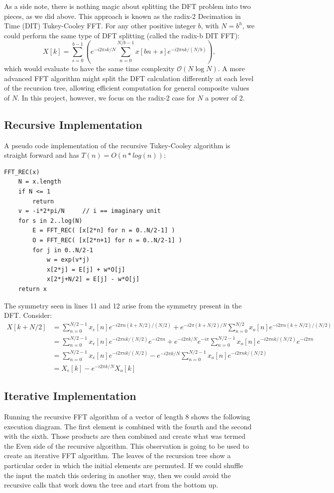 As a side note, there is nothing magic about splitting the DFT problem into two pieces, as we did above. This approach is known as the radix-2 Decimation in Time (DIT) Tukey-Cooley FFT. For any other positive integer $b$, with $N = b^h$, we could perform the same type of DFT splitting (called the radix-b DIT FFT):
\[
X[k] = \sum_{s=0}^{b-1} \left( e^{-i2\pi s k/N}\sum_{n=0}^{N/b-1}x[bn+s]e^{-i2\pi n k /(N/b)} \right),
\]
which would evaluate to have the same time complexity $\mathcal{O}(N\log N)$. A more advanced FFT algorithm might split the DFT calculation differently at each level of the recursion tree, allowing efficient computation for general composite values of $N$. In this project, however, we focus on the radix-2 case for $N$ a power of 2.

\pagebreak
\subsection{Recursive Implementation}
A pseudo code implementation of the recursive Tukey-Cooley algorithm is straight forward and has $T(n) = O(n * log(n))$:
\begin{lstlisting}
FFT_REC(x)
    N = x.length
    if N <= 1
        return
    v = -i*2*pi/N     // i == imaginary unit
    for s in 2..log(N)
        E = FFT_REC( [x[2*n] for n = 0..N/2-1] )
        O = FFT_REC( [x[2*n+1] for n = 0..N/2-1] )
        for j in 0..N/2-1
            w = exp(v*j)
            x[2*j] = E[j] + w*O[j]
            x[2*j+N/2] = E[j] - w*O[j]
    return x
\end{lstlisting}

The symmetry seen in lines 11 and 12 arise from the symmetry present in the DFT. Consider:
\begin{align*}
X[k+N/2] &= \sum_{n=0}^{N/2-1}x_e[n]e^{-i2\pi n (k+N/2) /(N/2)} + e^{-i2\pi (k+N/2)/N}\sum_{n=0}^{N/2}x_o[n]e^{-i2\pi n (k+N/2) /(N/2)}\\
&=\sum_{n=0}^{N/2-1}x_e[n]e^{-i2\pi n k/(N/2)}e^{-i2\pi n} + e^{-i2\pi k/N}e^{-i\pi}\sum_{n=0}^{N/2-1}x_o[n]e^{-i2\pi n k/(N/2)}e^{-i2\pi n}\\
&= \sum_{n=0}^{N/2-1}x_e[n]e^{-i2\pi n k/(N/2)} - e^{-i2\pi k/N}\sum_{n=0}^{N/2-1}x_o[n]e^{-i2\pi n k/(N/2)}\\
&= X_e[k] - e^{-i2\pi k/N}X_o[k]
\end{align*}


\subsection{Iterative Implementation}
Running the recursive FFT algorithm of a vector of length 8 shows the following execution diagram. The first element is combined with the fourth and the second with the sixth. Those products are then combined and create what was termed the Even side of the recursive algorithm. This observation is going to be used to create an iterative FFT algorithm. The leaves of the recursion tree show a particular order in which the initial elements are permuted. If we could shuffle the input the match this ordering in another way, then we could avoid the recursive calls that work down the tree and start from the bottom up.


